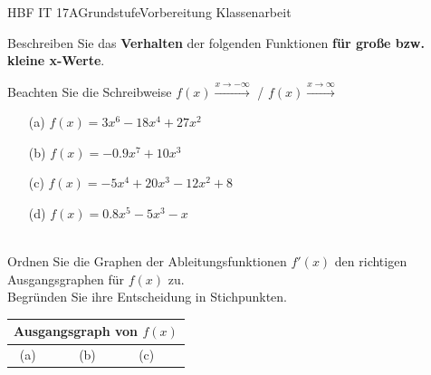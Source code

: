 \documentclass[oneside,openany,headings=optiontotoc,11pt,numbers=noenddot]{scrreprt}
\begin{document}
	\begin{worksheet}{HBF IT 17A}{Grundstufe}{Vorbereitung Klassenarbeit}
		\begin{framed}
			\noindent\normalsize
			Beschreiben Sie das \textbf{Verhalten} der folgenden Funktionen \textbf{für große bzw. kleine x-Werte}.
			\begin{framed}
				Beachten Sie die Schreibweise \(f(x) \xrightarrow{x \rightarrow -\infty}\) / \(f(x) \xrightarrow{x \rightarrow \infty}\)
			\end{framed}
			\begin{itemize}
				\item[(a)] \(f(x) = 3x^6 -18x^4 +27x^2\)
				\item[(b)] \(f(x) = -0.9x^7+10x^3\)
				\item[(c)] \(f(x) = -5x^4 +20x^3 -12x^2 +8\)
				\item[(d)] \(f(x) = 0.8x^5-5x^3-x\)
			\end{itemize}
			\hdashrule[0.5ex][x]{\textwidth}{0.1mm}{8mm 2pt}\\
			Ordnen Sie die Graphen der Ableitungsfunktionen \(f'(x)\) den richtigen Ausgangsgraphen für \(f(x)\) zu.\\
			Begründen Sie ihre Entscheidung in Stichpunkten.\\
			\begin{tabularx}{\textwidth}{|cX|cX|cX|}
				\hline
				\multicolumn{6}{|l|}{Ausgangsgraph von \(f(x)\)}\\
				\hline
				(a) & & (b) & & (c) &\\

\end{tabularx}
\end{framed}
\end{worksheet}
\end{document}
